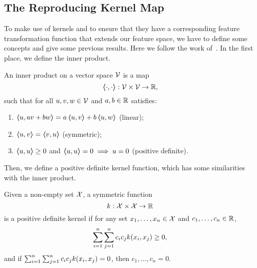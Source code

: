 
\subsection{The Reproducing Kernel Map} %
To make use of kernels and to ensure that they have a corresponding feature transformation function that extends our feature space, we have to define some concepts and give some previous results. Here we follow the work of~\citet{ScholkopfS02}.
In the first place, we define the inner product.
%
\begin{definition}
    An inner product on a vector space $\mathcal{V}$ is a map
    $$\bm{\left\langle} \cdot, \cdot \bm{\right\rangle}: \mathcal{V} \times \mathcal{V} \to \mathbb{R} , $$
    such that for all $u, v, w \in \mathcal{V}$ and $a, b \in \mathbb{R}$ satisfies:
    \begin{enumerate}
        \item $\bm{\left\langle} u, a v + b w \bm{\right\rangle} = a\bm{\left\langle} u, v \bm{\right\rangle} + b\bm{\left\langle} u, w \bm{\right\rangle}$ (linear);
        \item $\bm{\left\langle} u, v \bm{\right\rangle} = \bm{\left\langle} v, u \bm{\right\rangle}$ (symmetric);
        \item $\bm{\left\langle} u, u \bm{\right\rangle} \geq 0$ and $\bm{\left\langle} u, u \bm{\right\rangle} = 0 \implies u = 0$ (positive definite).
    \end{enumerate} 
\end{definition}
%
Then, we define a positive definite kernel function, which has some similarities with the inner product.
\begin{definition}
    Given a non-empty set $\mathcal{X}$, a symmetric function
    \begin{equation}
        \nonumber
        k: \mathcal{X} \times \mathcal{X} \to \mathbb{R}
    \end{equation}
    is a positive definite kernel if for any set $x_1, \ldots, x_n \in \mathcal{X}$ and $c_1, \ldots, c_n \in \mathbb{R}$,
    \begin{equation}
        \nonumber
        \sum_{i=1}^n \sum_{j=1}^n c_i c_j k(x_i, x_j) \geq 0 ,
    \end{equation} 
    and if $\sum_{i=1}^n \sum_{j=1}^n c_i c_j k(x_i, x_j) = 0$, then $c_1, \ldots, c_n = 0$.
\end{definition}

